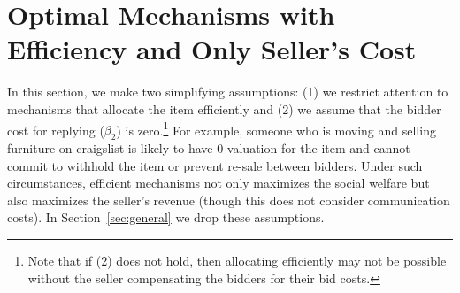 \section{Optimal Mechanisms with Efficiency and Only Seller's Cost}
\label{sec:efficient}

In this section, we make two simplifying assumptions: (1) we restrict
attention to mechanisms that allocate the item efficiently and (2) we
assume that the bidder cost for replying ($\beta_2$) is zero.\footnote{Note
that if (2) does not hold, then allocating efficiently may not be possible
without the seller compensating the bidders for their bid costs.}
For example, someone who is moving and selling furniture on craigslist is
likely to have $0$ valuation for the item 
and cannot commit to withhold the item or prevent re-sale between
bidders. Under such circumstances,  efficient mechanisms not only maximizes the
social welfare but also maximizes the seller's revenue
\cite{Ausubel99:EfficientOptimality} (though this does not consider
communication costs).
In Section~\ref{sec:general} we drop these assumptions.


%
%
%

